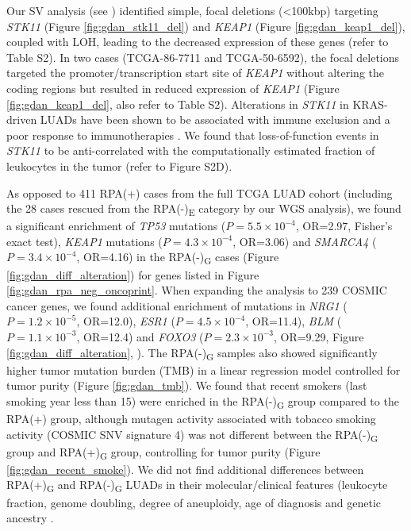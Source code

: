 \documentclass[phd,tocprelim]{cornell}
\begin{document}
Our SV analysis (see ) identified simple, focal deletions (<100kbp) targeting \textit{STK11} (Figure \ref{fig:gdan_stk11_del}) and \textit{KEAP1} (Figure \ref{fig:gdan_keap1_del}), coupled with LOH, leading to the decreased expression of these genes (refer to \cite{Carrot-Zhang2020-vl} Table S2). In two cases (TCGA-86-7711 and TCGA-50-6592), the focal deletions targeted the promoter/transcription start site of \textit{KEAP1} without altering the coding regions but resulted in reduced expression of \textit{KEAP1} (Figure \ref{fig:gdan_keap1_del}, also refer to \cite{Carrot-Zhang2020-vl} Table S2). Alterations in \textit{STK11} in KRAS-driven LUADs have been shown to be associated with immune exclusion and a poor response to immunotherapies \cite{Skoulidis2018-be}. We found that loss-of-function events in \textit{STK11} to be anti-correlated with the computationally estimated fraction of leukocytes in the tumor (refer to \cite{Carrot-Zhang2020-vl} Figure S2D). %

As opposed to 411 RPA(+) cases from the full TCGA LUAD cohort (including the 28 cases rescued from the RPA(-)\textsubscript{E} category by our WGS analysis), we found a significant enrichment of \textit{TP53} mutations ($P=5.5 \times 10^{-4}$, OR=2.97, Fisher's exact test), \textit{KEAP1} mutations ($P=4.3 \times 10^{-4}$, OR=3.06) and \textit{SMARCA4} ($P=3.4 \times 10^{-4}$, OR=4.16) in the RPA(-)\textsubscript{G} cases (Figure \ref{fig:gdan_diff_alteration}) for genes listed in Figure \ref{fig:gdan_rpa_neg_oncoprint}. When expanding the analysis to 239 COSMIC cancer genes, we found additional enrichment of mutations in \textit{NRG1} ($P=1.2 \times 10^{-5}$, OR=12.0), \textit{ESR1} ($P=4.5 \times 10^{-4}$, OR=11.4), \textit{BLM} ($P=1.1 \times 10^{-3}$, OR=12.4) and \textit{FOXO3} ($P=2.3 \times 10^{-3}$, OR=9.29, Figure \ref{fig:gdan_diff_alteration}, ). The RPA(-)\textsubscript{G} samples also showed significantly higher tumor mutation burden (TMB) in a linear regression model controlled for tumor purity (Figure \ref{fig:gdan_tmb}). We found that recent smokers (last smoking year less than 15) were enriched in the RPA(-)\textsubscript{G} group compared to the RPA(+) group, although mutagen activity associated with tobacco smoking activity (COSMIC SNV signature 4) was not different between the RPA(-)\textsubscript{G} group and RPA(+)\textsubscript{G} group, controlling for tumor purity (Figure \ref{fig:gdan_recent_smoke}). We did not find additional differences between RPA(+)\textsubscript{G} and RPA(-)\textsubscript{G} LUADs in their molecular/clinical features (leukocyte fraction, genome doubling, degree of aneuploidy, age of diagnosis and genetic ancestry \cite{Carrot-Zhang2020-vl}.
\end{document}
